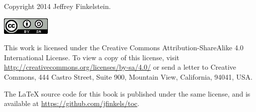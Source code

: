 {\small
Copyright 2014 Jeffrey Finkelstein.

{\centering \includegraphics[width=88px,height=31px]{ccbysa}}

This work is licensed under the Creative Commons Attribution-ShareAlike 4.0
International License. To view a copy of this license, visit
\url{http://creativecommons.org/licenses/by-sa/4.0/} or send a letter to
Creative Commons, 444 Castro Street, Suite 900, Mountain View, California,
94041, USA.

The \LaTeX{} source code for this book is published under the same license, and is available at \url{https://github.com/jfinkels/toc}.
}
